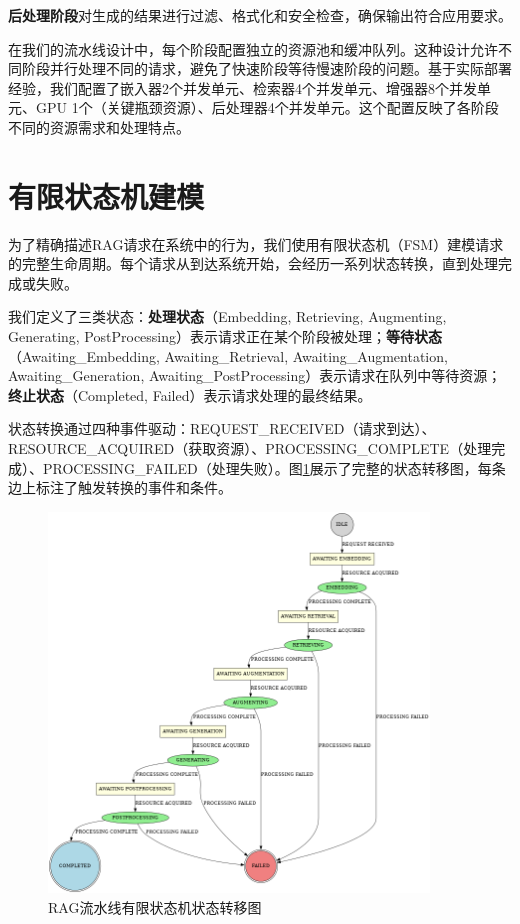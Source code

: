 \documentclass[a4paper]{article}
\begin{document}
\textbf{后处理阶段}对生成的结果进行过滤、格式化和安全检查，确保输出符合应用要求。

在我们的流水线设计中，每个阶段配置独立的资源池和缓冲队列。这种设计允许不同阶段并行处理不同的请求，避免了快速阶段等待慢速阶段的问题。基于实际部署经验，我们配置了嵌入器2个并发单元、检索器4个并发单元、增强器8个并发单元、GPU 1个（关键瓶颈资源）、后处理器4个并发单元。这个配置反映了各阶段不同的资源需求和处理特点。

\section{有限状态机建模}

为了精确描述RAG请求在系统中的行为，我们使用有限状态机（FSM）建模请求的完整生命周期。每个请求从到达系统开始，会经历一系列状态转换，直到处理完成或失败。

我们定义了三类状态：\textbf{处理状态}（Embedding, Retrieving, Augmenting, Generating, PostProcessing）表示请求正在某个阶段被处理；\textbf{等待状态}（Awaiting\_Embedding, Awaiting\_Retrieval, Awaiting\_Augmentation, Awaiting\_Generation, Awaiting\_PostProcessing）表示请求在队列中等待资源；\textbf{终止状态}（Completed, Failed）表示请求处理的最终结果。

状态转换通过四种事件驱动：REQUEST\_RECEIVED（请求到达）、RESOURCE\_ACQUIRED（获取资源）、PROCESSING\_COMPLETE（处理完成）、PROCESSING\_FAILED（处理失败）。图\ref{fig:fsm}展示了完整的状态转移图，每条边上标注了触发转换的事件和条件。

\begin{figure}[H]
    \centering
    \includegraphics[width=0.9\textwidth]{rag_fsm_diagram.png}
    \caption{RAG流水线有限状态机状态转移图}
    \label{fig:fsm}
\end{figure}
\end{document}
